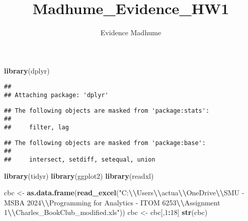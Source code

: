\documentclass[
]{article}
\title{Madhume\_Evidence\_HW1}
\author{Evidence Madhume}
\date{}
\newenvironment{Shaded}{\begin{snugshade}}{\end{snugshade}}
\newcommand{\AttributeTok}[1]{\textcolor[rgb]{0.13,0.29,0.53}{#1}}
\newcommand{\ConstantTok}[1]{\textcolor[rgb]{0.56,0.35,0.01}{#1}}
\newcommand{\DecValTok}[1]{\textcolor[rgb]{0.00,0.00,0.81}{#1}}
\newcommand{\FunctionTok}[1]{\textcolor[rgb]{0.13,0.29,0.53}{\textbf{#1}}}
\newcommand{\NormalTok}[1]{#1}
\newcommand{\OtherTok}[1]{\textcolor[rgb]{0.56,0.35,0.01}{#1}}
\newcommand{\SpecialCharTok}[1]{\textcolor[rgb]{0.81,0.36,0.00}{\textbf{#1}}}
\newcommand{\StringTok}[1]{\textcolor[rgb]{0.31,0.60,0.02}{#1}}
\begin{document}
\maketitle

\begin{Shaded}
\end{Shaded}

\begin{Shaded}
\begin{Highlighting}[]
\FunctionTok{library}\NormalTok{(dplyr)}
\end{Highlighting}
\end{Shaded}

\begin{verbatim}
## 
## Attaching package: 'dplyr'
\end{verbatim}

\begin{verbatim}
## The following objects are masked from 'package:stats':
## 
##     filter, lag
\end{verbatim}

\begin{verbatim}
## The following objects are masked from 'package:base':
## 
##     intersect, setdiff, setequal, union
\end{verbatim}

\begin{Shaded}
\begin{Highlighting}[]
\FunctionTok{library}\NormalTok{(tidyr)}
\FunctionTok{library}\NormalTok{(ggplot2)}
\FunctionTok{library}\NormalTok{(readxl)}


\NormalTok{cbc }\OtherTok{\textless{}{-}} \FunctionTok{as.data.frame}\NormalTok{(}\FunctionTok{read\_excel}\NormalTok{(}\StringTok{"C:}\SpecialCharTok{\textbackslash{}\textbackslash{}}\StringTok{Users}\SpecialCharTok{\textbackslash{}\textbackslash{}}\StringTok{actua}\SpecialCharTok{\textbackslash{}\textbackslash{}}\StringTok{OneDrive}\SpecialCharTok{\textbackslash{}\textbackslash{}}\StringTok{SMU {-} MSBA 2024}\SpecialCharTok{\textbackslash{}\textbackslash{}}\StringTok{Programming for Analytics {-} ITOM 6253}\SpecialCharTok{\textbackslash{}\textbackslash{}}\StringTok{Assignment 1}\SpecialCharTok{\textbackslash{}\textbackslash{}}\StringTok{Charles\_BookClub\_modified.xls"}\NormalTok{))}
\NormalTok{cbc }\OtherTok{\textless{}{-}}\NormalTok{ cbc[,}\DecValTok{1}\SpecialCharTok{:}\DecValTok{18}\NormalTok{] }
 \FunctionTok{str}\NormalTok{(cbc)}
\end{Highlighting}
\end{Shaded}
\end{document}
